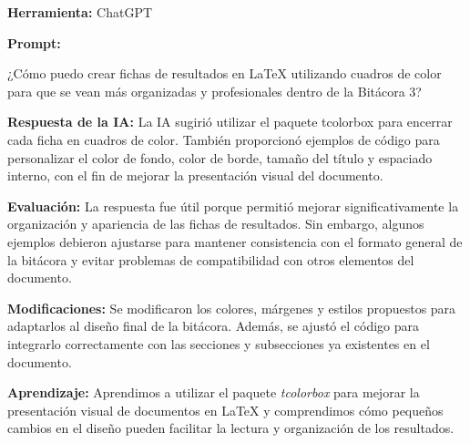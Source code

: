 \documentclass[12pt]{article}
\begin{document}
\begin{tcolorbox}[
colback=blue!5,
colframe=blue!75!white,
title=Diseño visual de las fichas en LaTeX]
\textbf{Herramienta:} ChatGPT

\textbf{Prompt:}

¿Cómo puedo crear fichas de resultados en LaTeX utilizando cuadros de color para que se vean más organizadas y profesionales dentro de la Bitácora 3?

\textbf{Respuesta de la IA:}
La IA sugirió utilizar el paquete tcolorbox para encerrar cada ficha en cuadros de color. También proporcionó ejemplos de código para personalizar el color de fondo, color de borde, tamaño del título y espaciado interno, con el fin de mejorar la presentación visual del documento.

\textbf{Evaluación:}
La respuesta fue útil porque permitió mejorar significativamente la organización y apariencia de las fichas de resultados. Sin embargo, algunos ejemplos debieron ajustarse para mantener consistencia con el formato general de la bitácora y evitar problemas de compatibilidad con otros elementos del documento.

\textbf{Modificaciones:}
Se modificaron los colores, márgenes y estilos propuestos para adaptarlos al diseño final de la bitácora. Además, se ajustó el código para integrarlo correctamente con las secciones y subsecciones ya existentes en el documento.

\textbf{Aprendizaje:}
Aprendimos a utilizar el paquete \textit{tcolorbox} para mejorar la presentación visual de documentos en LaTeX y comprendimos cómo pequeños cambios en el diseño pueden facilitar la lectura y organización de los resultados.

\end{tcolorbox}
\nocite{*}
\printbibliography
\end{document}
